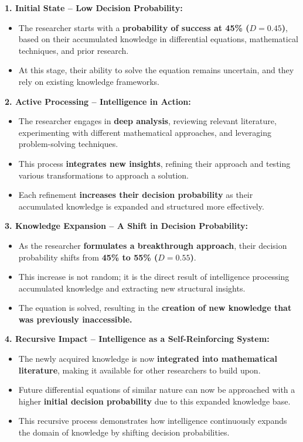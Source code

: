 \documentclass{article}
\newcommand{\bn}{\bigskip\noindent}
\begin{document}
\bn
{\bf 1. Initial State -- Low Decision Probability:}
\begin{itemize}
\item  The researcher starts with a {\bf probability of success at 45\% ($D = 0.45$)}, based on their accumulated knowledge in differential equations, mathematical techniques, and prior research.
\item At this stage, their ability to solve the equation remains uncertain, and they rely on existing knowledge frameworks.
\end{itemize}

\bn
{\bf 2. Active Processing -- Intelligence in Action:}

\begin{itemize}
\item  The researcher engages in {\bf deep analysis}, reviewing relevant literature, experimenting with different mathematical approaches, and leveraging problem-solving techniques.
\item This process {\bf integrates new insights}, refining their approach and testing various transformations to approach a solution.
\item  Each refinement {\bf increases their decision probability} as their accumulated knowledge is expanded and structured more effectively.
\end{itemize}

\bn
{\bf 3. Knowledge Expansion -- A Shift in Decision Probability:}
\begin{itemize}
\item  As the researcher {\bf formulates a breakthrough approach}, their decision probability shifts from {\bf 45\% to 55\% ($D = 0.55$)}.
\item This increase is not random; it is the direct result of intelligence processing accumulated knowledge and extracting new structural insights.
\item  The equation is solved, resulting in the {\bf creation of new knowledge that was previously inaccessible.}
\end{itemize}

\bn
{\bf 4. Recursive Impact  -- Intelligence as a Self-Reinforcing System:}
\begin{itemize}
\item  The newly acquired knowledge is now {\bf integrated into mathematical literature}, making it available for other researchers to build upon.
\item Future differential equations of similar nature can now be approached with a higher {\bf initial decision probability} due to this expanded knowledge base.
\item  This recursive process demonstrates how intelligence continuously expands the domain of knowledge by shifting decision probabilities.
\end{itemize}
\end{document}
